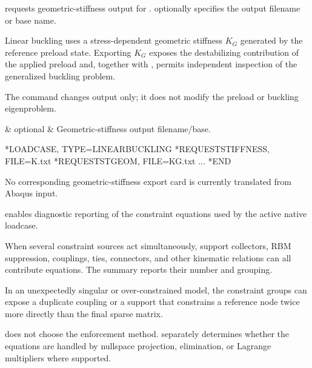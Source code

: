 
 requests geometric-stiffness output for .  optionally specifies the output filename or base name.

Linear buckling uses a stress-dependent geometric stiffness \(K_G\) generated by the reference preload state. Exporting \(K_G\) exposes the destabilizing contribution of the applied preload and, together with , permits independent inspection of the generalized buckling problem.

The command changes output only; it does not modify the preload or buckling eigenproblem.

\begin{keywordparameters}
 & optional & Geometric-stiffness output filename/base. \\
\end{keywordparameters}

\exampleheading
\begin{dialectexamples}
\begin{femasterdeck}
*LOADCASE, TYPE=LINEARBUCKLING
*REQUESTSTIFFNESS, FILE=K.txt
*REQUESTSTGEOM, FILE=KG.txt
...
*END
\end{femasterdeck}
\begin{noabaqus}
No corresponding geometric-stiffness export card is currently translated from Abaqus input.
\end{noabaqus}
\end{dialectexamples}


 enables diagnostic reporting of the constraint equations used by the active native loadcase.

When several constraint sources act simultaneously, support collectors, RBM suppression, couplings, ties, connectors, and other kinematic relations can all contribute equations. The summary reports their number and grouping.

In an unexpectedly singular or over-constrained model, the constraint groups can expose a duplicate coupling or a support that constrains a reference node twice more directly than the final sparse matrix.

 does not choose the enforcement method.  separately determines whether the equations are handled by nullspace projection, elimination, or Lagrange multipliers where supported.

